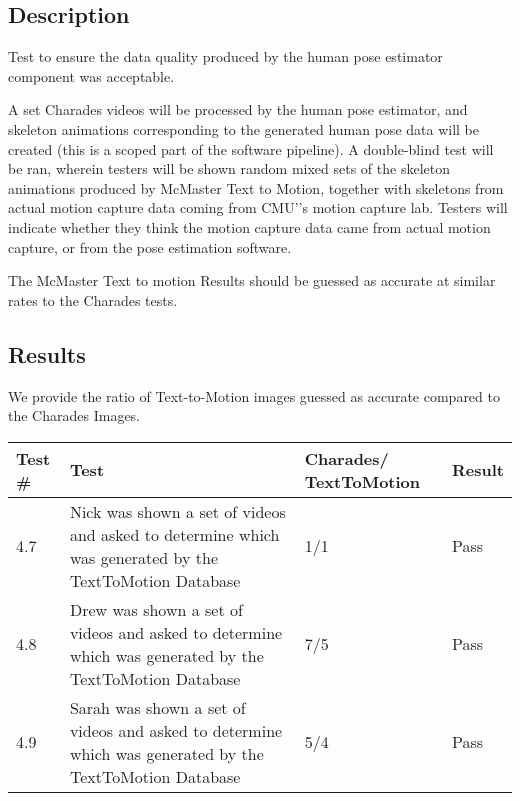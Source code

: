 \documentclass{scrreprt}
\begin{document}
\subsection{Description}

Test to ensure the data quality produced by the human pose estimator component
was acceptable.

A set Charades videos will be processed by the human pose estimator, and
skeleton animations corresponding to the generated human pose data will be
created (this is a scoped part of the software pipeline). A double-blind test
will be ran, wherein testers will be shown random mixed sets of the skeleton
animations produced by McMaster Text to Motion, together with skeletons from
actual motion capture data coming from CMU'’s motion capture lab. Testers will
indicate whether they think the motion capture data came from actual motion
capture, or from the pose estimation software.

The McMaster Text to motion Results should be guessed as accurate at similar
rates to the Charades tests.

\subsection{Results}

We provide the ratio of Text-to-Motion images guessed as accurate compared to the Charades Images.

\begin{table}[H]
        \centering
        \begin{tabular}{||p{0.75cm}|p{7.5cm}|p{2.5cm}|p{2.5cm}||}
                \hline
                \textbf Test \# & \textbf Test & \textbf Charades/ TextToMotion & \textbf Result\\
                \hline\hline
                4.7 & Nick was shown a set of videos and asked to determine which was generated by the TextToMotion Database &  1/1 & Pass\\
                \hline
                4.8 & Drew was shown a set of videos and asked to determine which was generated by the TextToMotion Database&  7/5  & Pass\\
                \hline
                4.9 & Sarah was shown a set of videos and asked to determine which was generated by the TextToMotion Database& 5/4 & Pass\\
                \hline
        \end{tabular}
\end{table}
\end{document}
